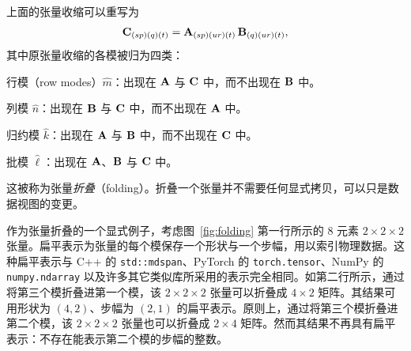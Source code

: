 上面的张量收缩可以重写为
\begin{align*}
\mathbf{C}_{(sp)(q)(t)} = \mathbf{A}_{(sp)(ur)(t)} \, \mathbf{B}_{(q)(ur)(t)},
\end{align*}
其中原张量收缩的各模被归为四类：
\begin{compactitem}
\item 行模（row modes）$\hat{m}$：出现在 $\mathbf{A}$ 与 $\mathbf{C}$ 中，而不出现在 $\mathbf{B}$ 中。
\item 列模 $\hat{n}$：出现在 $\mathbf{B}$ 与 $\mathbf{C}$ 中，而不出现在 $\mathbf{A}$ 中。
\item 归约模 $\hat{k}$：出现在 $\mathbf{A}$ 与 $\mathbf{B}$ 中，而不出现在 $\mathbf{C}$ 中。
\item 批模 $\hat{\ell}$：出现在 $\mathbf{A}$、$\mathbf{B}$ 与 $\mathbf{C}$ 中。
\end{compactitem}
这被称为张量{\em 折叠}（folding）。折叠一个张量并不需要任何显式拷贝，可以只是数据视图的变更。

作为张量折叠的一个显式例子，考虑图~\ref{fig:folding} 第一行所示的 8 元素 $2 {\times} 2 {\times} 2$ 张量。扁平表示为张量的每个模保存一个形状与一个步幅，用以索引物理数据。这种扁平表示与 C++ 的 {\tt std::mdspan}、PyTorch 的 {\tt torch.tensor}、NumPy 的 {\tt numpy.ndarray} 以及许多其它类似库所采用的表示完全相同。如第二行所示，通过将第三个模折叠进第一个模，该 $2 {\times} 2 {\times} 2$ 张量可以折叠成 $4 {\times} 2$ 矩阵。其结果可用形状为 $(4,2)$、步幅为 $(2,1)$ 的扁平表示。原则上，通过将第三个模折叠进第二个模，该 $2 {\times} 2 {\times} 2$ 张量也可以折叠成 $2 {\times} 4$ 矩阵。然而其结果不再具有扁平表示：不存在能表示第二个模的步幅的整数。

